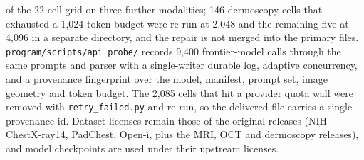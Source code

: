 of the 22-cell grid on three further modalities; 146 dermoscopy cells that exhausted a 1,024-token budget were re-run at 2,048 and the remaining five at 4,096 in a separate directory, and the repair is not merged into the primary files. \texttt{program/scripts/api\_probe/} records 9,400 frontier-model calls through the same prompts and parser with a single-writer durable log, adaptive concurrency, and a provenance fingerprint over the model, manifest, prompt set, image geometry and token budget. The 2,085 cells that hit a provider quota wall were removed with \texttt{retry\_failed.py} and re-run, so the delivered file carries a single provenance id. Dataset licenses remain those of the original releases (NIH ChestX-ray14, PadChest, Open-i, plus the MRI, OCT and dermoscopy releases), and model checkpoints are used under their upstream licenses.
